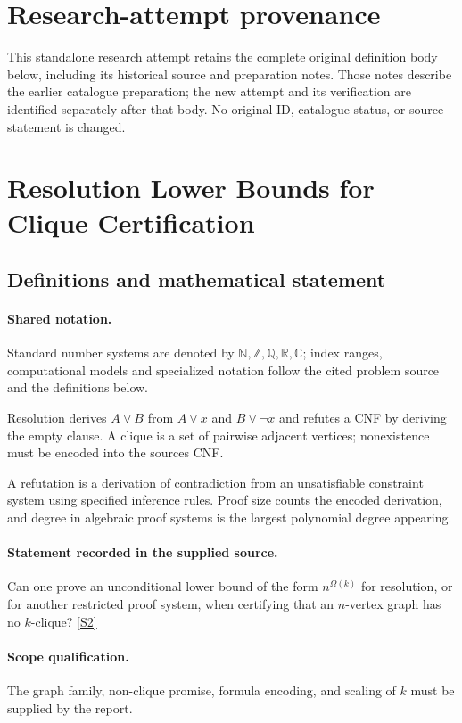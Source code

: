 \documentclass[11pt]{article}
\begin{document}
\section*{Research-attempt provenance}
This standalone research attempt retains the complete original definition body below,
including its historical source and preparation notes. Those notes describe the
earlier catalogue preparation; the new attempt and its verification are identified
separately after that body. No original ID, catalogue status, or source statement is changed.

\section{Resolution Lower Bounds for Clique Certification}\label{statement}

\subsection{Definitions and mathematical statement}

\paragraph{Shared notation.}Standard number systems are denoted by $\mathbb N,\mathbb Z,\mathbb Q,\mathbb R,\mathbb C$; index ranges, computational models and specialized notation follow the cited problem source and the definitions below.


Resolution derives $A\lor B$ from $A\lor x$ and $B\lor\neg x$ and refutes a CNF by deriving the empty clause. A clique is a set of pairwise adjacent vertices; nonexistence must be encoded into the source\textquotesingle s CNF.

A refutation is a derivation of contradiction from an unsatisfiable constraint system using specified inference rules. Proof size counts the encoded derivation, and degree in algebraic proof systems is the largest polynomial degree appearing.
\paragraph{Statement recorded in the supplied source.}
Can one prove an unconditional lower bound of the form $n^{\Omega(k)}$ for resolution, or for another restricted proof system, when certifying that an $n$-vertex graph has no $k$-clique? \href{https://doi.org/10.4171/owr/2017/37}{[S2]}
\paragraph{Scope qualification.}
The graph family, non-clique promise, formula encoding, and scaling of $k$ must be supplied by the report.
\end{document}
